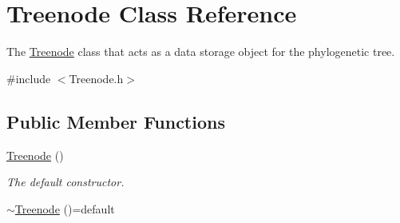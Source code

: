 \hypertarget{class_treenode}{}\section{Treenode Class Reference}
\label{class_treenode}


The \hyperlink{class_treenode}{Treenode} class that acts as a data storage object for the phylogenetic tree.  




{\ttfamily \#include $<$Treenode.\+h$>$}

\subsection*{Public Member Functions}
\begin{DoxyCompactItemize}
\item 
\hyperlink{class_treenode_a443ef4898396930c793f1c46c4a0bcc8}{Treenode} ()\hypertarget{class_treenode_a443ef4898396930c793f1c46c4a0bcc8}{}\label{class_treenode_a443ef4898396930c793f1c46c4a0bcc8}

\begin{DoxyCompactList}\small\item\em The default constructor. \end{DoxyCompactList}\item 
\hyperlink{class_treenode_a38da815205bca569e258c86f2c8324f3}{$\sim$\+Treenode} ()=default\hypertarget{class_treenode_a38da815205bca569e258c86f2c8324f3}{}\label{class_treenode_a38da815205bca569e258c86f2c8324f3}


\end{DoxyCompactItemize}
